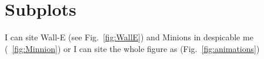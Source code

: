 \documentclass{report}
\begin{document}
\clearpage



\section*{Subplots}
I can site Wall-E (see Fig.~\ref{fig:WallE}) and Minions in despicable me (~\ref{fig:Minnion}) or I can site the whole figure as (Fig.~\ref{fig:animations})



\end{document}
